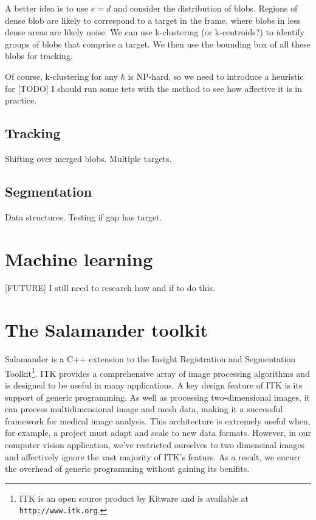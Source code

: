 \documentclass[letter]{article}
\newcounter{foot}
\begin{document}
A better idea is to use $e = d$ and consider the distribution of blobs. Regions of dense
blob are likely to correspond to a target in the frame, where blobs in less dense areas 
are likely noise. We can use k-clustering (or k-centroids?) to identify groups of blobs
that comprise a target. We then use the bounding box of all these blobs for tracking. 

Of course, k-clustering for any $k$ is NP-hard, so we need to introduce a heuristic for
[TODO] I should run some tets with the method to see how affective it is in practice. 


\subsection{Tracking}

Shifting over merged blobs. 
Multiple targets. 

\subsection{Segmentation}
Data structures. 
Testing if gap has target. 

\section{Machine learning}
[FUTURE] I still need to research how and if to do this. 

 
\section{The Salamander toolkit}
Salamander is a C++ extension to the Insight Registration and Segmentation Toolkit\footnote
{ITK is an open source product by Kitware and is available at \texttt{http://www.itk.org}.}.
ITK provides a comprehensive array of image processing algorithms and is designed to 
be useful in many applications. A key design feature of ITK is its support of generic programming. 
As well as processing two-dimensional images, it can process multidimensional image and 
mesh data, making it a successful framework for medical image analysis. This architecture 
is extremely useful when, for example, a project must adapt and scale to new data formats. 
However, in our computer vision application, we've restricted ourselves to two dimensinal 
images and affectively ignore the vast majority of ITK's featurs. As a result, we encurr 
the overhead of generic programming without gaining its benifits. 
\end{document}
